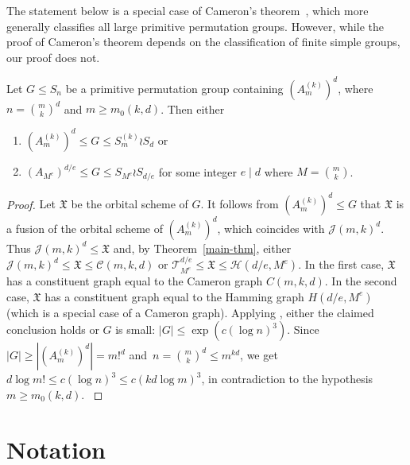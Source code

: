 \documentclass[ALCO]{cedram}
\newcommand{\cC}{{\mathcal C}}
\newcommand{\cH}{{\mathcal H}}
\newcommand{\cJ}{{\mathcal J}}
\def\X{\mathfrak{X}}
\def\T{\mathcal{T}}
\newcommand{\cH}{{\mathcal H}}
\begin{document}
{The statement below is a special case of Cameron's theorem~\cite{cameron,liebeck,maroti},
which more generally classifies all large primitive permutation groups.
However, while the proof of Cameron's theorem depends on the classification of finite simple groups, our proof does not.}
\begin{cor}
    \label{cor:cameron}
    Let $G \le S_n$ be a primitive permutation group containing $(A_m^{(k)})^d$,
    where $n = \binom{m}{k}^d$ and $m \ge m_0(k, d)$.
    Then either
    \begin{enumerate}
        \item $(A_m^{(k)})^d \le G \le S_m^{(k)} \wr S_d$ or
        \item $(A_{M^e})^{d/e} \le G \le S_{M^e} \wr S_{d/e}$ for some integer $e \mid d$ where $M = \binom{m}{k}$.
    \end{enumerate}
\end{cor}
\begin{proof}
{ Let $\X$ be the orbital scheme of $G$. It follows from $(A_m^{(k)})^d\leq G$ that $\X$ is a fusion of the orbital scheme of $(A_m^{(k)})^d$, which coincides with $\cJ(m,k)^d$.
Thus $\cJ(m,k)^d\leq \X$ and, by Theorem~\ref{main-thm}, either $\cJ(m,k)^d\leq \X \leq \cC(m,k,d)$ or $\T_{M^e}^{d/e} \leq \X \leq \cH(d/e, M^e)$.
In the first case, $\X$ has a constituent graph equal to the Cameron graph $C(m, k, d)$.
In the second case, $\X$ has a constituent graph equal to the Hamming graph $H(d/e, M^e)$ (which is a special case of a Cameron graph).
Applying \cite[Theorem~8.2.1]{wilmes-thesis}, either the claimed conclusion holds or $G$ is small: $|G| \le \exp(c (\log n)^3)$.
Since $|G| \ge |(A_m^{(k)})^d| = m!^d$ and~$n = \binom{m}{k}^d \le m^{kd}$,
we get $d \log m! \le c (\log n)^3 \le c (kd \log m)^3$, in contradiction to the hypothesis $m \ge m_0(k, d)$.
}
\end{proof}

\section{Notation}
\end{document}
